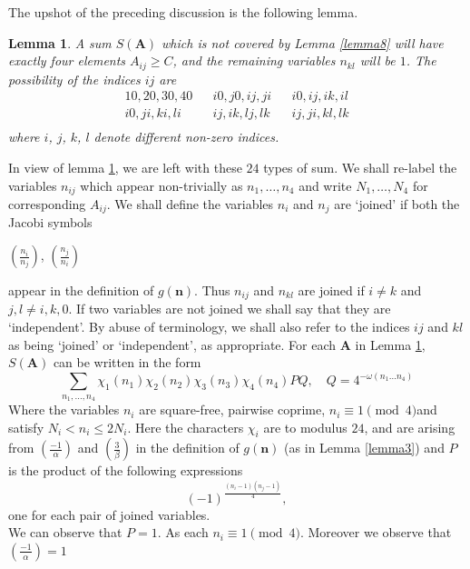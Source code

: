 \documentclass[11pt]{article}
\newcommand{\n}{\textbf{n}}
\newcommand{\A}{ \textbf{A} }
\newtheorem{lemma}[theorem]{Lemma}
\begin{document}
\noindent The upshot of the preceding discussion is the following lemma.
\begin{lemma}\label{lemma9}
A sum $S(\A)$ which is not covered by Lemma \ref{lemma8} will have exactly four elements $A_{ij}\geq C$, and the remaining variables $n_{kl}$ will be $1$. The possibility of the indices $ij$ are 
\begin{align*}
10,20,30,40&  &i0,j0,ij,ji&  &i0,ij,ik,il\\
i0,ji,ki,li&  &ij,ik,lj,lk&  &ij,ji,kl,lk\\
\end{align*}
\noindent where $i$, $j$, $k$, $l$ denote different non-zero indices.   
\end{lemma}
\noindent In view of lemma \ref{lemma9}, we are left with these $24$ types of sum. We shall re-label the variables $n_{ij}$ which appear non-trivially as $n_{1},\ldots,n_{4}$
and write $N_{1},\ldots,N_{4}$ for corresponding $A_{ij}$. We shall define the variables $n_{i}$ and $n_{j}$ are `joined' if both the Jacobi symbols
\begin{center}
$\left(\frac{n_{i}}{n_{j}}\right)$, $\left(\frac{n_{j}}{n_{i}}\right)$
\end{center}
appear in the definition of $g(\n)$. Thus $n_{ij}$ and $n_{kl}$ are joined if $i\neq k$ and $j,l\neq i,k,0$. If two variables are not joined we shall say that they are `independent'. By abuse of terminology, we shall also refer to the indices $ij$ and $kl$ as being `joined' or `independent', as appropriate. For each $\A$ in Lemma \ref{lemma9}, $S(\A)$ can be written in the form
\begin{equation}\label{eq:7}
\sum\limits_{n_{1},\ldots,n_{4}}\chi_{1}(n_{1})\chi_{2}(n_{2})\chi_{3}(n_{3})\chi_{4}(n_{4})PQ,\quad Q=4^{-\omega(n_{1}\ldots n_{4})}
\end{equation}
Where the variables $n_{i}$ are square-free, pairwise coprime, $n_{i}\equiv 1\pmod{4}$and satisfy $N_{i}<n_{i}\leq 2N_{i}$. Here the characters $\chi_{i}$ are to modulus $24$, and are arising from $\left(\frac{-1}{\alpha}\right)$ and $\left(\frac{3}{\beta}\right)$ in the definition of $g(\n)$ (as in Lemma \ref{lemma3}) and $P$ is the product of the following expressions
$$(-1)^{\frac{(n_{i}-1)(n_{j}-1)}{4}},$$
one for each pair of joined variables.\\
\noindent We can observe that $P=1$. As each $n_{i}\equiv 1\pmod{4}$. Moreover we observe that $\left(\frac{-1}{\alpha}\right)=1$  \\
\end{document}
